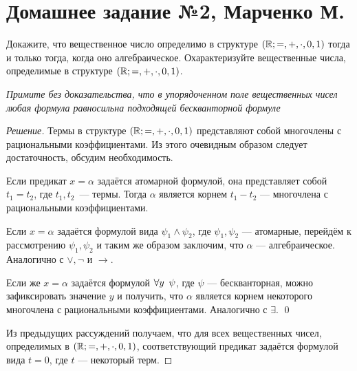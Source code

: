 


    \section*{Домашнее задание №2, Марченко М.}

    \begin{problem}[1]
        Докажите, что вещественное число определимо в структуре \((\mathbb{R}; =, +, \cdot, 0, 1)\) тогда и только тогда, когда оно алгебраическое. Охарактеризуйте вещественные числа, определимые в структуре \((\mathbb{R}; =, +, \cdot, 0, 1)\).

        {\itshape Примите без доказательства, что в упорядоченном поле вещественных чисел любая формула равносильна подходящей бескванторной формуле}
    \end{problem}
    \begin{proof}[Решение]
        Термы в структуре \((\mathbb{R}; =, +, \cdot, 0, 1)\) представляют собой многочлены с рациональными коэффициентами. Из этого очевидным образом следует достаточность, обсудим необходимость.
        
        Если предикат \(x = \alpha\) задаётся атомарной формулой, она представляет собой \(t_1 = t_2\), где \(t_1, t_2\)~--- термы. Тогда \(\alpha\) является корнем \(t_1 - t_2\) --- многочлена с рациональными коэффициентами.
        
        Если \(x = \alpha\) задаётся формулой вида \(\psi_1 \land \psi_2\), где \(\psi_1, \psi_2\) --- атомарные, перейдём к рассмотрению \(\psi_1, \psi_2\) и таким же образом заключим, что \(\alpha\) --- алгебраическое. Аналогично с \(\lor, \lnot\) и \(\to\).

        Если же \(x = \alpha\) задаётся формулой \(\forall y \enskip \psi\), где \(\psi\) --- бескванторная, можно зафиксировать значение \(y\) и получить, что \(\alpha\) является корнем некоторого многочлена с рациональными коэффициентами. Аналогично с \(\exists\). \qed

        Из предыдущих рассуждений получаем, что для всех вещественных чисел, определимых в \((\mathbb{R}; =, +, \cdot, 0, 1)\), соответствующий предикат задаётся формулой вида \(t = 0\), где \(t\) --- некоторый терм.
    \end{proof}


